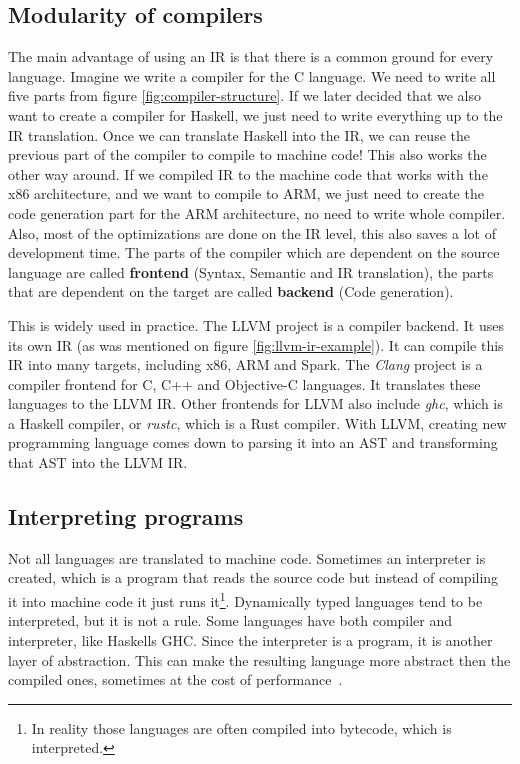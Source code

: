 \subsection{Modularity of compilers}
The main advantage of using an IR is that there is a common ground for every
language. Imagine we write a compiler for the C language. We need to write all
five parts from figure \ref{fig:compiler-structure}. If we later decided that
we also want to create a compiler for Haskell, we just need to write everything
up to the IR translation. Once we can translate Haskell into the IR, we can
reuse the previous part of the compiler to compile to machine code! This also
works the other way around. If we compiled IR to the machine code that works
with the x86 architecture, and we want to compile to ARM, we just need to
create the code generation part for the ARM architecture, no need to write
whole compiler. Also, most of the optimizations are done on the IR level, this
also saves a lot of development time. The parts of the compiler which are
dependent on the source language are called \textbf{frontend} (Syntax, Semantic
and IR translation), the parts that are dependent on the target are called
\textbf{backend} (Code generation).

This is widely used in practice. The LLVM \cite{llvm} project is a compiler
backend. It uses its own IR (as was mentioned on figure
\ref{fig:llvm-ir-example}). It can compile this IR into many targets, including
x86, ARM and Spark. The \textit{Clang} project is a compiler frontend for C,
C++ and Objective-C languages. It translates these languages to the LLVM IR.
Other frontends for LLVM also include \textit{ghc}, which is a Haskell
compiler, or \textit{rustc}, which is a Rust compiler. With LLVM, creating new
programming language comes down to parsing it into an AST and transforming that
AST into the LLVM IR.

\subsection{Interpreting programs}
Not all languages are translated to machine code. Sometimes an interpreter is
created, which is a program that reads the source code but instead of compiling
it into machine code it just runs it\footnote{In reality those languages are
often compiled into bytecode, which is interpreted.}. Dynamically typed
languages tend to be interpreted, but it is not a rule. Some languages have
both compiler and interpreter, like Haskells GHC. Since the interpreter is a
program, it is another layer of abstraction. This can make the resulting
language more abstract then the compiled ones, sometimes at the cost
of performance~\cite{jit}. 

